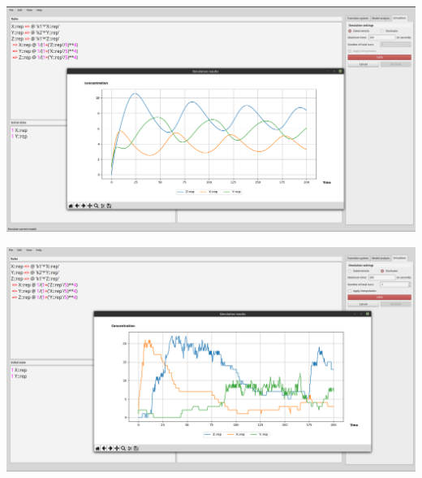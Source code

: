 \documentclass[10pt]{beamer}
\begin{document}
\begin{frame}[standout]
\thispagestyle{empty}
\begin{center}
\includegraphics[width=1\textwidth]{BCSgen_deter}
\end{center}
\end{frame}


\begin{frame}[standout]
\thispagestyle{empty}
\begin{center}
\includegraphics[width=1\textwidth]{BCSgen_stoch}
\end{center}
\end{frame}
\end{document}

